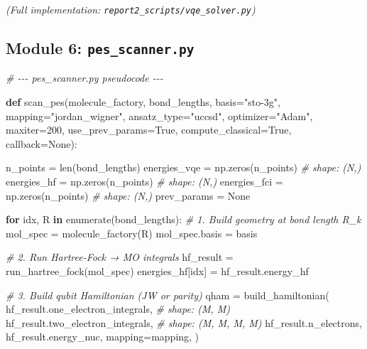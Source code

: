 \documentclass[
  11pt,
]{report}
\newenvironment{Shaded}{}{}
\newcommand{\BuiltInTok}[1]{\textcolor[rgb]{0.00,0.50,0.00}{#1}}
\newcommand{\CommentTok}[1]{\textcolor[rgb]{0.38,0.63,0.69}{\textit{#1}}}
\newcommand{\ControlFlowTok}[1]{\textcolor[rgb]{0.00,0.44,0.13}{\textbf{#1}}}
\newcommand{\DecValTok}[1]{\textcolor[rgb]{0.25,0.63,0.44}{#1}}
\newcommand{\KeywordTok}[1]{\textcolor[rgb]{0.00,0.44,0.13}{\textbf{#1}}}
\newcommand{\NormalTok}[1]{#1}
\newcommand{\OperatorTok}[1]{\textcolor[rgb]{0.40,0.40,0.40}{#1}}
\newcommand{\StringTok}[1]{\textcolor[rgb]{0.25,0.44,0.63}{#1}}
\newcommand{\VariableTok}[1]{\textcolor[rgb]{0.10,0.09,0.49}{#1}}
\begin{document}
\emph{(Full implementation: \texttt{report2\_scripts/vqe\_solver.py})}

\subsection{\texorpdfstring{Module 6:
\texttt{pes\_scanner.py}}{Module 6: pes\_scanner.py}}\label{module-6-pes_scanner.py}

\begin{Shaded}
\begin{Highlighting}[]
\CommentTok{\# {-}{-}{-} pes\_scanner.py pseudocode {-}{-}{-}}

\KeywordTok{def}\NormalTok{ scan\_pes(molecule\_factory, bond\_lengths, basis}\OperatorTok{=}\StringTok{"sto{-}3g"}\NormalTok{,}
\NormalTok{             mapping}\OperatorTok{=}\StringTok{"jordan\_wigner"}\NormalTok{, ansatz\_type}\OperatorTok{=}\StringTok{"uccsd"}\NormalTok{,}
\NormalTok{             optimizer}\OperatorTok{=}\StringTok{"Adam"}\NormalTok{, maxiter}\OperatorTok{=}\DecValTok{200}\NormalTok{,}
\NormalTok{             use\_prev\_params}\OperatorTok{=}\VariableTok{True}\NormalTok{, compute\_classical}\OperatorTok{=}\VariableTok{True}\NormalTok{, callback}\OperatorTok{=}\VariableTok{None}\NormalTok{):}

\NormalTok{    n\_points }\OperatorTok{=} \BuiltInTok{len}\NormalTok{(bond\_lengths)}
\NormalTok{    energies\_vqe }\OperatorTok{=}\NormalTok{ np.zeros(n\_points)       }\CommentTok{\# shape: (N,)}
\NormalTok{    energies\_hf  }\OperatorTok{=}\NormalTok{ np.zeros(n\_points)       }\CommentTok{\# shape: (N,)}
\NormalTok{    energies\_fci }\OperatorTok{=}\NormalTok{ np.zeros(n\_points)       }\CommentTok{\# shape: (N,)}
\NormalTok{    prev\_params }\OperatorTok{=} \VariableTok{None}

    \ControlFlowTok{for}\NormalTok{ idx, R }\KeywordTok{in} \BuiltInTok{enumerate}\NormalTok{(bond\_lengths):}
        \CommentTok{\# 1. Build geometry at bond length R\_k}
\NormalTok{        mol\_spec }\OperatorTok{=}\NormalTok{ molecule\_factory(R)}
\NormalTok{        mol\_spec.basis }\OperatorTok{=}\NormalTok{ basis}

        \CommentTok{\# 2. Run Hartree{-}Fock → MO integrals}
\NormalTok{        hf\_result }\OperatorTok{=}\NormalTok{ run\_hartree\_fock(mol\_spec)}
\NormalTok{        energies\_hf[idx] }\OperatorTok{=}\NormalTok{ hf\_result.energy\_hf}

        \CommentTok{\# 3. Build qubit Hamiltonian (JW or parity)}
\NormalTok{        qham }\OperatorTok{=}\NormalTok{ build\_hamiltonian(}
\NormalTok{            hf\_result.one\_electron\_integrals,    }\CommentTok{\# shape: (M, M)}
\NormalTok{            hf\_result.two\_electron\_integrals,    }\CommentTok{\# shape: (M, M, M, M)}
\NormalTok{            hf\_result.n\_electrons,}
\NormalTok{            hf\_result.energy\_nuc,}
\NormalTok{            mapping}\OperatorTok{=}\NormalTok{mapping,}
\NormalTok{        )}


\end{Highlighting}
\end{Shaded}
\end{document}

